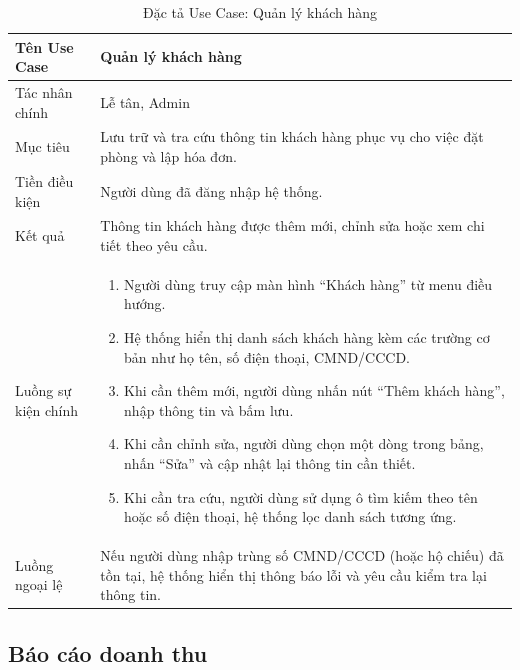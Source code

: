 \documentclass[13pt,a4paper]{extreport}
\begin{document}
\begin{table}[H]
\centering
\caption{Đặc tả Use Case: Quản lý khách hàng}
\label{tab:uc-customers}
\begin{tabular}{p{4cm}p{10cm}}
\hline
Tên Use Case & Quản lý khách hàng\\
\hline
Tác nhân chính & Lễ tân, Admin\\
Mục tiêu & Lưu trữ và tra cứu thông tin khách hàng phục vụ cho việc đặt phòng và lập hóa đơn.\\
Tiền điều kiện & Người dùng đã đăng nhập hệ thống.\\
Kết quả & Thông tin khách hàng được thêm mới, chỉnh sửa hoặc xem chi tiết theo yêu cầu.\\
\hline
Luồng sự kiện chính &
\begin{enumerate}
  \item Người dùng truy cập màn hình ``Khách hàng'' từ menu điều hướng.
  \item Hệ thống hiển thị danh sách khách hàng kèm các trường cơ bản như họ tên, số điện thoại, CMND/CCCD.
  \item Khi cần thêm mới, người dùng nhấn nút ``Thêm khách hàng'', nhập thông tin và bấm lưu.
  \item Khi cần chỉnh sửa, người dùng chọn một dòng trong bảng, nhấn ``Sửa'' và cập nhật lại thông tin cần thiết.
  \item Khi cần tra cứu, người dùng sử dụng ô tìm kiếm theo tên hoặc số điện thoại, hệ thống lọc danh sách tương ứng.
\end{enumerate}\\
\hline
Luồng ngoại lệ &
Nếu người dùng nhập trùng số CMND/CCCD (hoặc hộ chiếu) đã tồn tại, hệ thống hiển thị thông báo lỗi và yêu cầu kiểm tra lại thông tin.\\
\hline
\end{tabular}
\end{table}

\subsection*{Báo cáo doanh thu}
\end{document}
